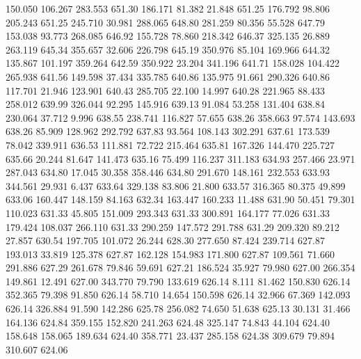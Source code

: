  150.050  106.267  283.553       651.30
 186.171   81.382   21.848       651.25
 176.792   98.806  205.243       651.25
 245.710   30.981  288.065       648.80
 281.259   80.356   55.528       647.79
 153.038   93.773  268.085       646.92
 155.728   78.860  218.342       646.37
 325.135   26.889  263.119       645.34
 355.657   32.606  226.798       645.19
 350.976   85.104  169.966       644.32
 135.867  101.197  359.264       642.59
 350.922   23.204  341.196       641.71
 158.028  104.422  265.938       641.56
 149.598   37.434  335.785       640.86
 135.975   91.661  290.326       640.86
 117.701   21.946  123.901       640.43
 285.705   22.100   14.997       640.28
 221.965   88.433  258.012       639.99
 326.044   92.295  145.916       639.13
  91.084   53.258  131.404       638.84
 230.064   37.712    9.996       638.55
 238.741  116.827   57.655       638.26
 358.663   97.574  143.693       638.26
  85.909  128.962  292.792       637.83
  93.564  108.143  302.291       637.61
 173.539   78.042  339.911       636.53
 111.881   72.722  215.464       635.81
 167.326  144.470  225.727       635.66
  20.244   81.647  141.473       635.16
  75.499  116.237  311.183       634.93
 257.466   23.971  287.043       634.80
  17.045   30.358  358.446       634.80
 291.670  148.161  232.553       633.93
 344.561   29.931    6.437       633.64
 329.138   83.806   21.800       633.57
 316.365   80.375   49.899       633.06
 160.447  148.159   84.163       632.34
 163.447  160.233   11.488       631.90
  50.451   79.301  110.023       631.33
  45.805  151.009  293.343       631.33
 300.891  164.177   77.026       631.33
 179.424  108.037  266.110       631.33
 290.259  147.572  291.788       631.29
 209.320   89.212   27.857       630.54
 197.705  101.072   26.244       628.30
 277.650   87.424  239.714       627.87
 193.013   33.819  125.378       627.87
 162.128  154.983  171.800       627.87
 109.561   71.660  291.886       627.29
 261.678   79.846   59.691       627.21
 186.524   35.927   79.980       627.00
 266.354  149.861   12.491       627.00
 343.770   79.790  133.619       626.14
   8.111   81.462  150.830       626.14
 352.365   79.398   91.850       626.14
  58.710   14.654  150.598       626.14
  32.966   67.369  142.093       626.14
 326.884   91.590  142.286       625.78
 256.082   74.650   51.638       625.13
  30.131   31.466  164.136       624.84
 359.155  152.820  241.263       624.48
 325.147   74.843   44.104       624.40
 158.648  158.065  189.634       624.40
 358.771   23.437  285.158       624.38
 309.679   79.894  310.607       624.06
